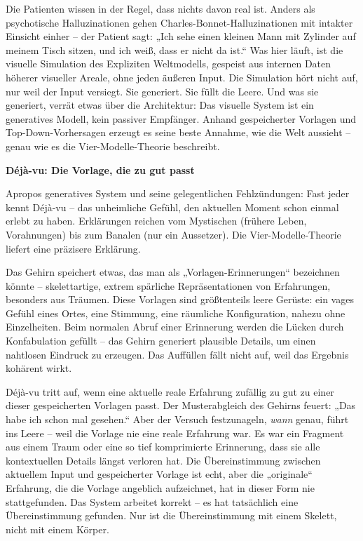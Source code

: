 \documentclass[11pt, twoside, openright]{book}
\begin{document}
Die Patienten wissen in der Regel, dass nichts davon real ist. Anders als psychotische Halluzinationen gehen Charles-Bonnet-Halluzinationen mit intakter Einsicht einher -- der Patient sagt: „Ich sehe einen kleinen Mann mit Zylinder auf meinem Tisch sitzen, und ich weiß, dass er nicht da ist.“ Was hier läuft, ist die visuelle Simulation des Expliziten Weltmodells, gespeist aus internen Daten höherer visueller Areale, ohne jeden äußeren Input. Die Simulation hört nicht auf, nur weil der Input versiegt. Sie generiert. Sie füllt die Leere. Und was sie generiert, verrät etwas über die Architektur: Das visuelle System ist ein generatives Modell, kein passiver Empfänger. Anhand gespeicherter Vorlagen und Top-Down-Vorhersagen erzeugt es seine beste Annahme, wie die Welt aussieht -- genau wie es die Vier-Modelle-Theorie beschreibt.

\textbf{Déjà-vu: Die Vorlage, die zu gut passt}

Apropos generatives System und seine gelegentlichen Fehlzündungen: Fast jeder kennt Déjà-vu -- das unheimliche Gefühl, den aktuellen Moment schon einmal erlebt zu haben. Erklärungen reichen vom Mystischen (frühere Leben, Vorahnungen) bis zum Banalen (nur ein Aussetzer). Die Vier-Modelle-Theorie liefert eine präzisere Erklärung.

Das Gehirn speichert etwas, das man als „Vorlagen-Erinnerungen“ bezeichnen könnte -- skelettartige, extrem spärliche Repräsentationen von Erfahrungen, besonders aus Träumen. Diese Vorlagen sind größtenteils leere Gerüste: ein vages Gefühl eines Ortes, eine Stimmung, eine räumliche Konfiguration, nahezu ohne Einzelheiten. Beim normalen Abruf einer Erinnerung werden die Lücken durch Konfabulation gefüllt -- das Gehirn generiert plausible Details, um einen nahtlosen Eindruck zu erzeugen. Das Auffüllen fällt nicht auf, weil das Ergebnis kohärent wirkt.

Déjà-vu tritt auf, wenn eine aktuelle reale Erfahrung zufällig zu gut zu einer dieser gespeicherten Vorlagen passt. Der Musterabgleich des Gehirns feuert: „Das habe ich schon mal gesehen.“ Aber der Versuch festzunageln, \textit{wann} genau, führt ins Leere -- weil die Vorlage nie eine reale Erfahrung war. Es war ein Fragment aus einem Traum oder eine so tief komprimierte Erinnerung, dass sie alle kontextuellen Details längst verloren hat. Die Übereinstimmung zwischen aktuellem Input und gespeicherter Vorlage ist echt, aber die „originale“ Erfahrung, die die Vorlage angeblich aufzeichnet, hat in dieser Form nie stattgefunden. Das System arbeitet korrekt -- es hat tatsächlich eine Übereinstimmung gefunden. Nur ist die Übereinstimmung mit einem Skelett, nicht mit einem Körper.
\end{document}
